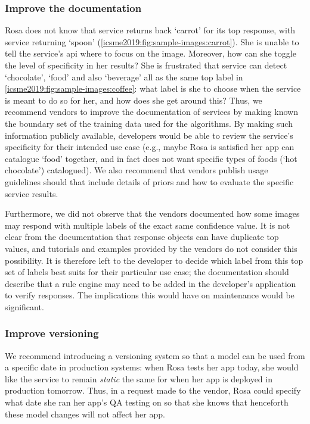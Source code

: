 \subsubsection{Improve the documentation}
Rosa does not know that service \googleapi{} returns back `carrot' for its top response, with service \awsapi{} returning `spoon' (\cref{icsme2019:fig:sample-images:carrot}). She is unable to tell the service's \gls{api} where to focus on the image. Moreover, how can she toggle the level of specificity in her results? She is frustrated that service \awsapi{} can detect `chocolate', `food' and also `beverage' all as the same top label in \cref{icsme2019:fig:sample-images:coffee}: what label is she to choose when the service is meant to do so for her, and how does she get around this? Thus, we recommend vendors to improve the documentation of services by making known the boundary set of the training data used for the algorithms. By making such information publicly available, developers would be able to review the service's specificity for their intended use case (e.g., maybe Rosa is satisfied her app can catalogue `food' together, and in fact does not want specific types of foods (`hot chocolate') catalogued). We also recommend that vendors publish usage guidelines should that include details of priors and how to evaluate the specific service results.

Furthermore, we did not observe that the vendors documented how some images may respond with multiple labels of the exact same confidence value. It is not clear from the documentation that response objects can have duplicate top values, and tutorials and examples provided by the vendors do not consider this possibility. It is therefore left to the developer to decide which label from this top set of labels best suits for their particular use case; the documentation should describe that a rule engine may need to be added in the developer's application to verify responses. The implications this would have on maintenance would be significant.

\subsubsection{Improve versioning}
We recommend introducing a versioning system so that a model can be used from a specific date in production systems: when Rosa tests her app today, she would like the service to remain \textit{static} the same for when her app is deployed in production tomorrow. Thus, in a request made to the vendor, Rosa could specify what date she ran her app's QA testing on so that she knows that henceforth these model changes will not affect her app.

